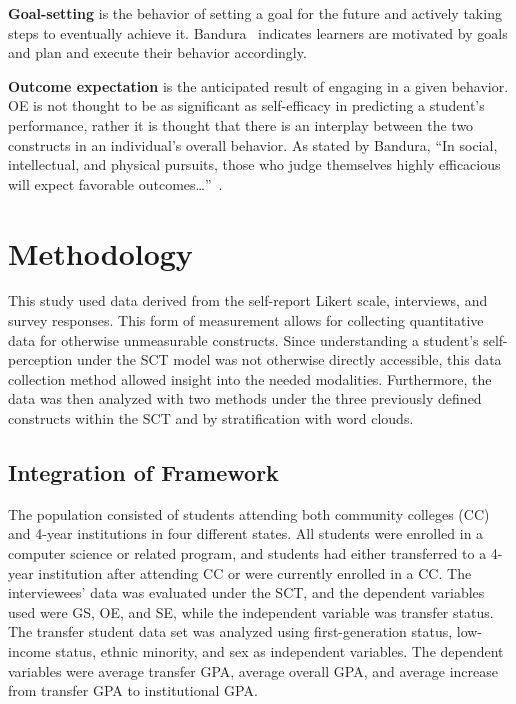 \documentclass{article}
\begin{document}
\small
\textbf{Goal-setting} is the behavior of setting a goal for the future and actively taking steps to eventually achieve it. Bandura~\cite{bandura1986social} indicates learners are motivated by goals and plan and execute their behavior accordingly.

\small
\textbf{Outcome expectation} is the anticipated result of engaging in a given behavior. OE is not thought to be as significant as self-efficacy in predicting a student's performance, rather it is thought that there is an interplay between the two constructs in an individual's overall behavior. As stated by Bandura, “In social, intellectual, and physical pursuits, those who judge themselves highly efficacious will expect favorable outcomes…”~\cite{bandura1986social}.


\section{Methodology}
\small
This study used data derived from the self-report Likert scale, interviews, and survey responses. This form of measurement allows for collecting quantitative data for otherwise unmeasurable constructs. Since understanding a student's self-perception under the SCT model was not otherwise directly accessible, this data collection method allowed insight into the needed modalities. Furthermore, the data was then analyzed with two methods under the three previously defined constructs within the SCT and by stratification with word clouds.

\subsection{Integration of Framework}
\small
The population consisted of students attending both community colleges (CC) and 4-year institutions in four different states.  All students were enrolled in a computer science or related program, and students had either transferred to a 4-year institution after attending CC or were currently enrolled in a CC. The interviewees' data was evaluated under the SCT, and the dependent variables used were GS, OE, and SE, while the independent variable was transfer status. The transfer student data set was analyzed using first-generation status, low-income status, ethnic minority, and sex as independent variables. The dependent variables were average transfer GPA, average overall GPA, and average increase from transfer GPA to institutional GPA.
\end{document}
